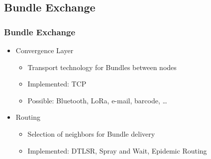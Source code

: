 \begin{frame}
\begin{figure}
{
    }
  \end{figure}
\end{frame}

\subsection{Bundle Exchange}

\begin{frame}
  \frametitle{Bundle Exchange}

  \begin{itemize}
  \item Convergence Layer
    \begin{itemize}
    \item Transport technology for Bundles between nodes
    \item Implemented: TCP
    \item Possible: Bluetooth, LoRa, e-mail, barcode, \dots
    \end{itemize}

  \item Routing
    \begin{itemize}
    \item Selection of neighbors for Bundle delivery
    \item Implemented: DTLSR, Spray and Wait, Epidemic Routing
    \end{itemize}
  \end{itemize}
\end{frame}
